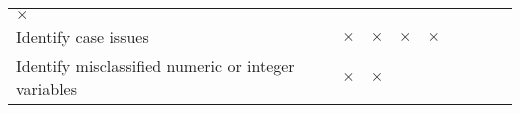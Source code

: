 \documentclass[]{report}
\begin{document}
\begin{longtable}[]{@{}lcccccccc@{}}
\begin{minipage}[t]{0.09\columnwidth}
\(\times\)\strut
\end{minipage} & \begin{minipage}[t]{0.06\columnwidth}\centering
\strut
\end{minipage} & \begin{minipage}[t]{0.06\columnwidth}\centering
\strut
\end{minipage} & \begin{minipage}[t]{0.05\columnwidth}\centering
\strut
\end{minipage} & \begin{minipage}[t]{0.06\columnwidth}\centering
\strut
\end{minipage}\tabularnewline
\begin{minipage}[t]{0.28\columnwidth}\raggedright
Identify case issues\strut
\end{minipage} & \begin{minipage}[t]{0.06\columnwidth}\centering
\(\times\)\strut
\end{minipage} & \begin{minipage}[t]{0.06\columnwidth}\centering
\(\times\)\strut
\end{minipage} & \begin{minipage}[t]{0.06\columnwidth}\centering
\(\times\)\strut
\end{minipage} & \begin{minipage}[t]{0.09\columnwidth}\centering
\(\times\)\strut
\end{minipage} & \begin{minipage}[t]{0.06\columnwidth}\centering
\strut
\end{minipage} & \begin{minipage}[t]{0.06\columnwidth}\centering
\strut
\end{minipage} & \begin{minipage}[t]{0.05\columnwidth}\centering
\strut
\end{minipage} & \begin{minipage}[t]{0.06\columnwidth}\centering
\strut
\end{minipage}\tabularnewline
\begin{minipage}[t]{0.28\columnwidth}\raggedright
Identify misclassified numeric or integer variables\strut
\end{minipage} & \begin{minipage}[t]{0.06\columnwidth}\centering
\(\times\)\strut
\end{minipage} & \begin{minipage}[t]{0.06\columnwidth}\centering
\(\times\)\strut

\end{minipage}
\end{longtable}
\end{document}
